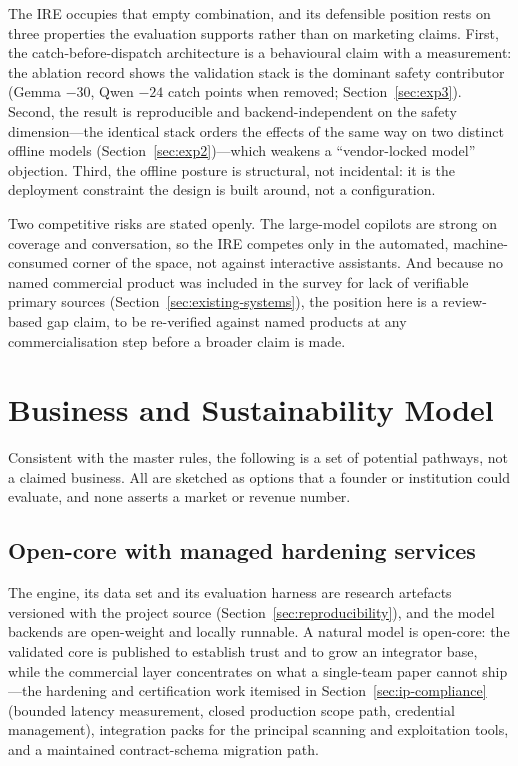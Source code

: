 The IRE occupies that empty combination, and its defensible position rests on
three properties the evaluation supports rather than on marketing claims.
First, the catch-before-dispatch architecture is a behavioural claim with a
measurement: the ablation record shows the validation stack is the dominant
safety contributor (Gemma $-30$, Qwen $-24$ catch points when removed;
Section~\ref{sec:exp3}). Second, the result is reproducible and
backend-independent on the safety dimension---the identical stack orders the
effects of the same way on two distinct offline models
(Section~\ref{sec:exp2})---which weakens a ``vendor-locked model'' objection.
Third, the offline posture is structural, not incidental: it is the deployment
constraint the design is built around, not a configuration.

Two competitive risks are stated openly. The large-model copilots are strong on
coverage and conversation, so the IRE competes only in the automated,
machine-consumed corner of the space, not against interactive assistants. And
because no named commercial product was included in the survey for lack of
verifiable primary sources (Section~\ref{sec:existing-systems}),
the position here is a review-based gap claim, to be re-verified against named
products at any commercialisation step before a broader claim is made.

\section{Business and Sustainability Model}\label{sec:business-model}

Consistent with the master rules, the following is a set of potential pathways,
not a claimed business. All are sketched as options that a founder or
institution could evaluate, and none asserts a market or revenue number.

\subsection*{Open-core with managed hardening services}

The engine, its data set and its evaluation harness are research artefacts
versioned with the project source
(Section~\ref{sec:reproducibility}), and the model backends are open-weight
and locally runnable. A natural model is open-core: the validated core is
published to establish trust and to grow an integrator base, while the
commercial layer concentrates on what a single-team paper cannot ship---the
hardening and certification work itemised in Section~\ref{sec:ip-compliance}
(bounded latency measurement, closed production scope path, credential
management), integration packs for the principal scanning and exploitation
tools, and a maintained contract-schema migration path.

